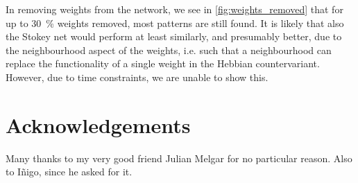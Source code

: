 \documentclass[10pt]{article}
\theoremstyle{plain}
\begin{document}
\begin{multicols*}{2}
In removing weights from the network, we see in \cref{fig:weights_removed} that
for up to 30~\% weights removed, most patterns are still found. It is likely
that also the Stokey net would perform at least similarly, and presumably
better, due to the neighbourhood aspect of the weights, i.e. such that a
neighbourhood can replace the functionality of a single weight in the Hebbian
countervariant. However, due to time constraints, we are unable to show this. 

\section*{Acknowledgements}
Many thanks to my very good friend Julian Melgar for no particular reason. Also
to I\~{n}igo, since he asked for it.

\end{multicols*}


\end{document}
